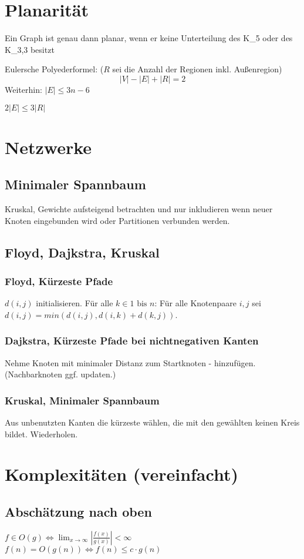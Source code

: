 \documentclass[10pt,a4paper]{article}
\newcommand{\abs}[1]{\ensuremath{\left\vert#1\right\vert}}
\begin{document}
\section{Planarität}
Ein Graph ist genau dann planar, wenn er keine Unterteilung des K_5 oder des K_3,3 besitzt

Eulersche Polyederformel: ($R$ sei die Anzahl der Regionen inkl. Außenregion)
\[|V|-|E|+|R|=2\]
Weiterhin: $|E| \leq 3n -6$

$2|E| \leq 3|R|$
\section{Netzwerke}
\subsection{Minimaler Spannbaum}
Kruskal, Gewichte aufsteigend betrachten und nur inkludieren wenn neuer Knoten eingebunden wird oder Partitionen verbunden werden.
\subsection{Floyd, Dajkstra, Kruskal}
\subsubsection{Floyd, Kürzeste Pfade}
$d(i,j)$ initialisieren. Für alle $k \in 1 \mbox{ bis } n$: Für alle Knotenpaare $i, j$ sei $d(i, j) = min (d(i,j), d(i,k) + d(k,j))$.
\subsubsection{Dajkstra, Kürzeste Pfade bei nichtnegativen Kanten}
Nehme Knoten mit minimaler Distanz zum Startknoten - hinzufügen. (Nachbarknoten ggf. updaten.)
\subsubsection{Kruskal, Minimaler Spannbaum}
Aus unbenutzten Kanten die kürzeste wählen, die mit den gewählten keinen Kreis bildet. Wiederholen.
\section{Komplexitäten (vereinfacht)}
\subsection{Abschätzung nach oben}
$f \in O(g) \Leftrightarrow \lim_{x \rightarrow \infty} \abs{\frac{f(x)}{g(x)}} < \infty $ \,\,\,\,\,\,\,\,\,\,\,\,\,\,\,\,\,\,\,\,\,\,\,\,\,\,\,\, $f(n) = O(g(n)) \Leftrightarrow f(n) \leq c \cdot g(n)$
\end{document}
